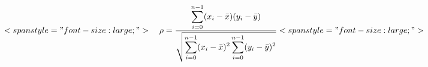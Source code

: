 \documentclass[12pt]{article}
\begin{document}
$  \begin{equation*}<span style="font-size: large;">    \rho = \dfrac{\displaystyle\sum_{i=0}^{n-1}(x_i-\bar{x})(y_i-\bar{y})}{\sqrt{\displaystyle\sum_{i=0}^{n-1}(x_i-\bar{x})^2 \displaystyle\sum_{i=0}^{n-1}(y_i-\bar{y})^2}}<span style="font-size: large;">    \end{equation*}     $
\end{document}
